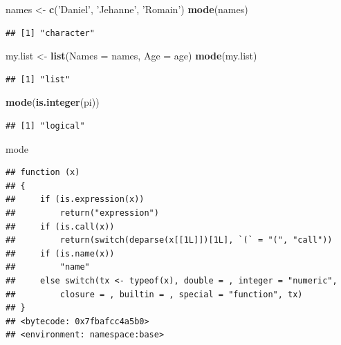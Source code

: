 \documentclass[]{book}
\newenvironment{Shaded}{\begin{snugshade}}{\end{snugshade}}
\newcommand{\DataTypeTok}[1]{\textcolor[rgb]{0.13,0.29,0.53}{#1}}
\newcommand{\KeywordTok}[1]{\textcolor[rgb]{0.13,0.29,0.53}{\textbf{#1}}}
\newcommand{\NormalTok}[1]{#1}
\newcommand{\StringTok}[1]{\textcolor[rgb]{0.31,0.60,0.02}{#1}}
\begin{document}
\begin{Shaded}
\begin{Highlighting}[]
\NormalTok{names <-}\StringTok{ }\KeywordTok{c}\NormalTok{(}\StringTok{'Daniel'}\NormalTok{, }\StringTok{'Jehanne'}\NormalTok{, }\StringTok{'Romain'}\NormalTok{)}
\KeywordTok{mode}\NormalTok{(names)}
\end{Highlighting}
\end{Shaded}

\begin{verbatim}
## [1] "character"
\end{verbatim}

\begin{Shaded}
\begin{Highlighting}[]
\NormalTok{my.list <-}\StringTok{ }\KeywordTok{list}\NormalTok{(}\DataTypeTok{Names =}\NormalTok{ names, }\DataTypeTok{Age =}\NormalTok{ age)}
\KeywordTok{mode}\NormalTok{(my.list)}
\end{Highlighting}
\end{Shaded}

\begin{verbatim}
## [1] "list"
\end{verbatim}

\begin{Shaded}
\begin{Highlighting}[]
\KeywordTok{mode}\NormalTok{(}\KeywordTok{is.integer}\NormalTok{(pi))}
\end{Highlighting}
\end{Shaded}

\begin{verbatim}
## [1] "logical"
\end{verbatim}

\begin{Shaded}
\begin{Highlighting}[]
\NormalTok{mode}
\end{Highlighting}
\end{Shaded}

\begin{verbatim}
## function (x) 
## {
##     if (is.expression(x)) 
##         return("expression")
##     if (is.call(x)) 
##         return(switch(deparse(x[[1L]])[1L], `(` = "(", "call"))
##     if (is.name(x)) 
##         "name"
##     else switch(tx <- typeof(x), double = , integer = "numeric", 
##         closure = , builtin = , special = "function", tx)
## }
## <bytecode: 0x7fbafcc4a5b0>
## <environment: namespace:base>
\end{verbatim}
\end{document}
